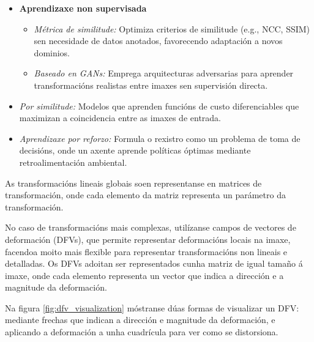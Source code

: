 \begin{itemize}
\begin{itemize}
\begin{itemize}
            \item \textbf{Aprendizaxe non supervisada}
            \begin{itemize}
                \item \textit{Métrica de similitude:} Optimiza criterios de similitude (e.g., NCC, SSIM) sen necesidade de datos anotados, favorecendo adaptación a novos dominios.
                \item \textit{Baseado en GANs:} Emprega arquitecturas adversarias para aprender transformacións realistas entre imaxes sen supervisión directa.
            \end{itemize}
            
            \item \textit{Por similitude:} Modelos que aprenden funcións de custo diferenciables que maximizan a coincidencia entre as imaxes de entrada.
            \item \textit{Aprendizaxe por reforzo:} Formula o rexistro como un problema de toma de decisións, onde un axente aprende políticas óptimas mediante retroalimentación ambiental.
        \end{itemize}
    \end{itemize}
\end{itemize}

As transformacións lineais globais soen representanse en matrices de transformación, onde cada elemento da matriz representa un parámetro da transformación.

No caso de transformacións mais complexas, utilízanse campos de vectores de deformación (\gls{DFV}s), que permite representar deformacións locais na imaxe, facendoa moito mais flexible para representar transformacións non lineais e detalladas.
Os DFVs adoitan ser representados cunha matriz de igual tamaño á imaxe, onde cada elemento representa un vector que indica a dirección e a magnitude da deformación.

Na figura \ref{fig:dfv_visualization} móstranse dúas formas de visualizar un DFV: mediante frechas que indican a dirección e magnitude da deformación, e aplicando a deformación a unha cuadrícula para ver como se distorsiona.

